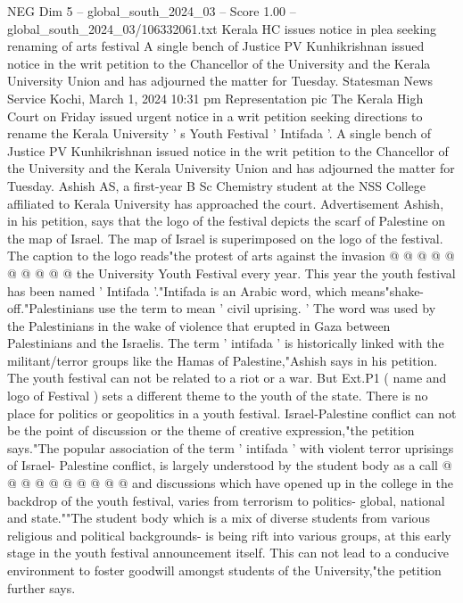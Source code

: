 \begin{textsample}{NEG Dim 5 – global\_south\_2024\_03 – Score 1.00 – global\_south\_2024\_03/106332061.txt}  \label{ex:f5_neg_202}
Kerala HC issues notice in plea seeking renaming of arts festival A single bench of Justice PV Kunhikrishnan issued notice in the writ petition to the Chancellor of the University and the Kerala University Union and has adjourned the matter for Tuesday.
Statesman News Service Kochi, March 1, 2024 10:31 pm Representation pic The Kerala High Court on Friday issued urgent notice in a writ petition seeking directions to rename the Kerala University ' s Youth Festival ' Intifada '.
A single bench of Justice PV Kunhikrishnan issued notice in the writ petition to the Chancellor of the University and the Kerala University Union and has adjourned the matter for Tuesday.
Ashish AS, a first-year B Sc Chemistry student at the NSS College affiliated to Kerala University has approached the court.
Advertisement Ashish, in his petition, says that the logo of the festival depicts the scarf of Palestine on the map of Israel.
The map of Israel is superimposed on the logo of the festival.
The caption to the logo reads"the protest of arts against the invasion @ @ @ @ @ @ @ @ @ @ the University Youth Festival every year.
This year the youth festival has been named ' Intifada '."Intifada is an Arabic word, which means"shake-off."Palestinians use the term to mean ' civil uprising. ' The word was used by the Palestinians in the wake of violence that erupted in Gaza between Palestinians and the Israelis.
The term ' intifada ' is historically linked with the militant/terror groups like the Hamas of Palestine,"Ashish says in his petition.
The youth festival can not be related to a riot or a war.
But Ext.P1 ( name and logo of Festival ) sets a different theme to the youth of the state.
There is no place for politics or geopolitics in a youth festival.
Israel-Palestine conflict can not be the point of discussion or the theme of creative expression,"the petition says."The popular association of the term ' intifada ' with violent terror uprisings of Israel- Palestine conflict, is largely understood by the student body as a call @ @ @ @ @ @ @ @ @ @ and discussions which have opened up in the college in the backdrop of the youth festival, varies from terrorism to politics- global, national and state.""The student body which is a mix of diverse students from various religious and political backgrounds- is being rift into various groups, at this early stage in the youth festival announcement itself.
This can not lead to a conducive environment to foster goodwill amongst students of the University,"the petition further says.

\end{textsample}
